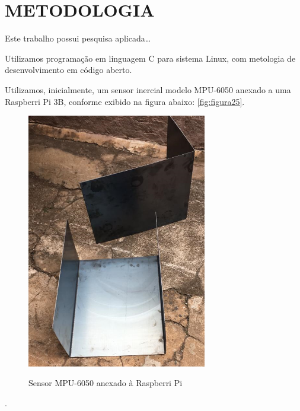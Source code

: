 \chapter{METODOLOGIA}
\label{chap:metodologia}

Este trabalho possui pesquisa aplicada\ldots

Utilizamos programação em linguagem C para sistema Linux, com metologia de desenvolvimento em código aberto.

Utilizamos, inicialmente, um sensor inercial modelo MPU-6050 anexado a uma Raspberri Pi 3B, conforme exibido na figura abaixo: \ref{fig:figura25}.

\begin{figure}[H]
    \centering
    \caption{Sensor MPU-6050 anexado à Raspberri Pi}
    \includegraphics[width=0.7\textwidth]{figuras/figu22.png}
    \label{fig:figura22}
\end{figure}






























.













